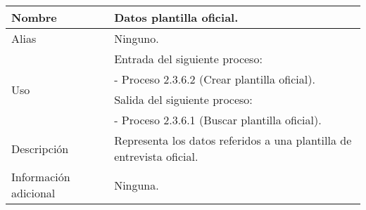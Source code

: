 \begin{center}
  \begin{tabular}{| l | p{9cm} |}
    \hline
    Nombre & \textbf{Datos plantilla oficial}.\\
    \hline
    Alias & Ninguno.\\
    \hline
    \multirow{4}{*}{Uso} & Entrada del siguiente proceso:\\
                         & - Proceso 2.3.6.2 (Crear plantilla oficial).\\
                         & Salida del siguiente proceso:\\
                         & - Proceso 2.3.6.1 (Buscar plantilla oficial).\\
    \hline
    Descripción & Representa los datos referidos a una plantilla de entrevista
                  oficial.\\
    \hline
    Información adicional & Ninguna.\\
    \hline
  \end{tabular}
\end{center}
